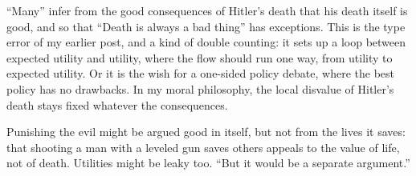 ``Many'' infer from the good consequences of Hitler's death that his death itself is good, and so that ``Death is always a bad thing'' has exceptions. This is the type error of my earlier post, and a kind of double counting: it sets up a loop between expected utility and utility, where the flow should run one way, from utility to expected utility. Or it is the wish for a one-sided policy debate, where the best policy has no drawbacks.  In my moral philosophy, the local disvalue of Hitler's death stays fixed whatever the consequences. 

Punishing the evil might be argued good in itself, but not from the lives it saves: that shooting a man with a leveled gun saves others appeals to the value of life, not of death. Utilities might be leaky too. ``But it would be a separate argument.''
